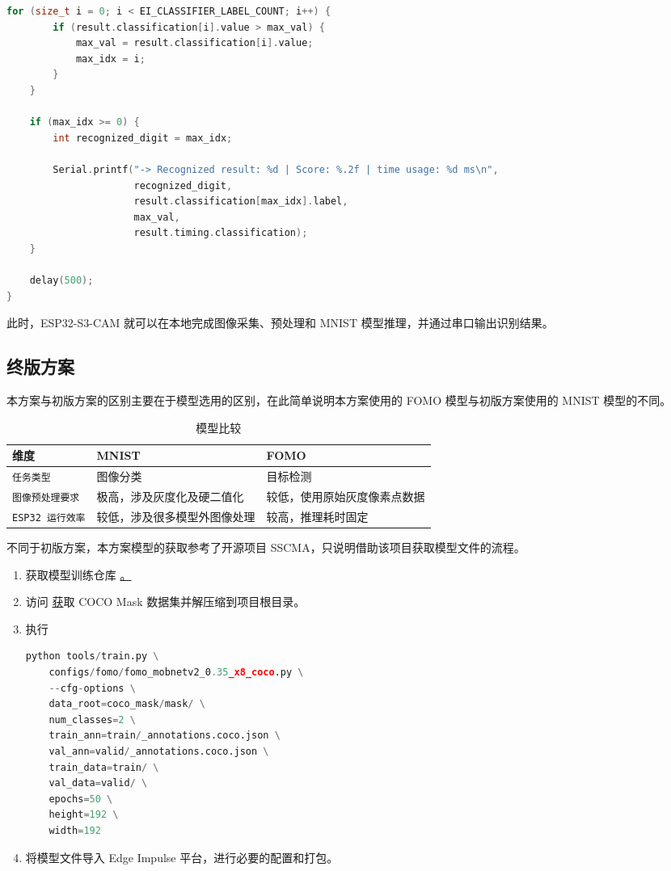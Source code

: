 \documentclass[a4paper,12pt]{ctexart}
\begin{document}
\begin{lstlisting}[language=C++,caption={嵌入模型到 ESP32-S3}]
    for (size_t i = 0; i < EI_CLASSIFIER_LABEL_COUNT; i++) {
        if (result.classification[i].value > max_val) {
            max_val = result.classification[i].value;
            max_idx = i;
        }
    }

    if (max_idx >= 0) {
        int recognized_digit = max_idx; 
        
        Serial.printf("-> Recognized result: %d | Score: %.2f | time usage: %d ms\n",
                      recognized_digit,
                      result.classification[max_idx].label,
                      max_val,
                      result.timing.classification);
    }

    delay(500); 
}
\end{lstlisting}

此时，ESP32-S3-CAM 就可以在本地完成图像采集、预处理和 MNIST 模型推理，并通过串口输出识别结果。

\subsection{终版方案}

本方案与初版方案的区别主要在于模型选用的区别，在此简单说明本方案使用的 FOMO 模型与初版方案使用的 MNIST 模型的不同。

\begin{table}[H]
\centering
\caption{模型比较}
\begin{tabular}{L{3cm} L{6cm} L{6cm}}
\toprule
\textbf{维度} & \textbf{MNIST} & \textbf{FOMO} \\
\midrule
\texttt{任务类型} & 图像分类 & 目标检测 \\
\texttt{图像预处理要求} & 极高，涉及灰度化及硬二值化 & 较低，使用原始灰度像素点数据 \\
\texttt{ESP32 运行效率}  & 较低，涉及很多模型外图像处理 & 较高，推理耗时固定 \\
\bottomrule
\end{tabular}
\end{table}

不同于初版方案，本方案模型的获取参考了开源项目 SSCMA\cite{sscmanual_mcu_soc}，只说明借助该项目获取模型文件的流程。

\begin{enumerate}
    \item 获取模型训练仓库 \href{https://github.com/Seeed-Studio/ModelAssistant}。
    \item 访问 \href{https://files.seeedstudio.com/sscma/datasets/coco_mask.zip} 获取 COCO Mask 数据集并解压缩到项目根目录。
    \item 执行
    \begin{lstlisting}[language=python,caption={训练 FOMO 模型}]
python tools/train.py \
    configs/fomo/fomo_mobnetv2_0.35_x8_coco.py \
    --cfg-options \
    data_root=coco_mask/mask/ \
    num_classes=2 \
    train_ann=train/_annotations.coco.json \
    val_ann=valid/_annotations.coco.json \
    train_data=train/ \
    val_data=valid/ \
    epochs=50 \
    height=192 \
    width=192
    \end{lstlisting}
    \item 将模型文件导入 Edge Impulse 平台，进行必要的配置和打包。
\end{enumerate}
\end{document}
